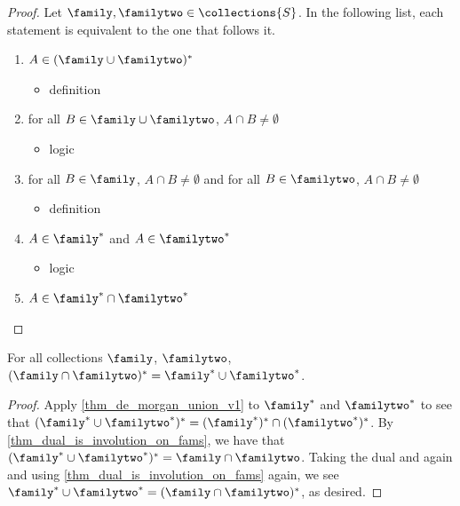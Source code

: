 \begin{proof}
Let $\family, \familytwo \in \collections{S}$. In the following list, each statement is equivalent to the one that follows it.
    \begin{enumerate}
        \item $A \in (\family \cup \familytwo)^*$
        \begin{itemize}
            \item[--] definition
        \end{itemize}

        \item for all $B \in \family \cup \familytwo$, $A \cap B \neq \emptyset$
        \begin{itemize}
            \item[--] logic
        \end{itemize}

        \item for all $B \in \family$, $A \cap B \neq \emptyset$ and for all $B \in \familytwo$, $A \cap B \neq \emptyset$
        \begin{itemize}
            \item[--] definition
        \end{itemize}

        \item $A \in \family^*$ and $A \in \familytwo^*$
        \begin{itemize}
            \item[--] logic
        \end{itemize}

        \item $A \in \family^* \cap \familytwo^*$
    \end{enumerate}
\end{proof}

\begin{theorem}
    \label{thm_de_morgan_union_v2}
    \leanok{}
    For all collections $\family$, $\familytwo$, $(\family \cap \familytwo)^* = \family^* \cup \familytwo^*$.
\end{theorem}

\begin{proof}
    Apply \cref{thm_de_morgan_union_v1} to $\family^*$ and $\familytwo^*$ to see that $(\family^* \cup \familytwo^*)^* = (\family^*)^* \cap (\familytwo^*)^*$.  By \cref{thm_dual_is_involution_on_fams}, we have that $(\family^* \cup \familytwo^*)^* = \family \cap \familytwo$.  Taking the dual and again and using \cref{thm_dual_is_involution_on_fams} again, we see $\family^* \cup \familytwo^* = (\family \cap \familytwo)^*$, as desired.
\end{proof}

